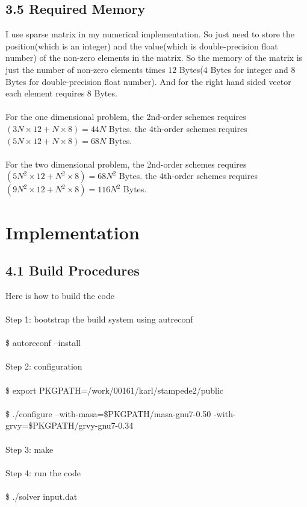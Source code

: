 \documentclass{article}
\begin{document}
\subsection*{3.5 Required Memory}
I use sparse matrix in my numerical implementation. So just need to store the position(which is an integer) and the value(which is double-precision float number) of the non-zero elements in the matrix. So the memory of the matrix is just the number of non-zero elements times $12$ Bytes($4$ Bytes for integer and $8$ Bytes for double-precision float number). And for the right hand sided vector each element requires $8$ Bytes.\\ \\
For the one dimensional problem, the 2nd-order schemes requires $(3N\times12 + N\times8) = 44N$ Bytes. the 4th-order schemes requires $(5N\times12 + N\times8) = 68N$ Bytes.\\ \\
For the two dimensional problem, the 2nd-order schemes requires $(5N^2\times12 + N^2\times8) = 68N^2$ Bytes. the 4th-order schemes requires $(9N^2\times12 + N^2\times8) = 116N^2$ Bytes.

\section{Implementation}

\subsection*{4.1 Build Procedures}
Here is how to build the code\\ \\
Step 1: bootstrap the build system using autreconf\\ \\
\$ autoreconf --install\\ \\
Step 2: configuration\\ \\
\$ export PKGPATH=/work/00161/karl/stampede2/public\\ \\
\$ ./configure --with-masa=\$PKGPATH/masa-gnu7-0.50 -with-grvy=\$PKGPATH/grvy-gnu7-0.34\\ \\
Step 3: make\\ \\
Step 4: run the code\\ \\
\$ ./solver input.dat
\end{document}
